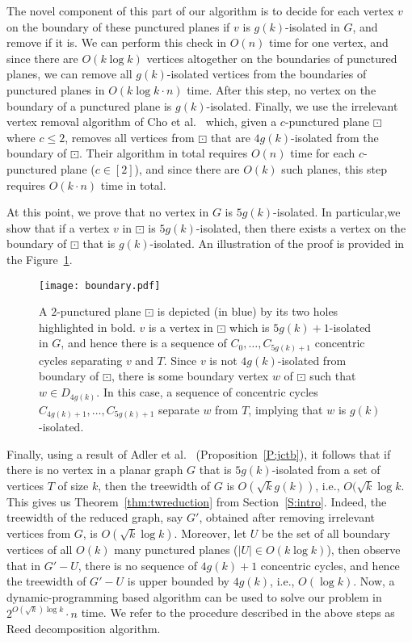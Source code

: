 \documentclass{article}
\numberwithin{claimcounter}{lemma}
\begin{document}
The novel component of this part of our algorithm is to decide for each vertex $v$ on the boundary of these punctured planes if $v$ is $g(k)$-isolated in $G$, and remove if it is. We can perform this check in $O(n)$ time for one vertex, and since there are  $O(k \log k)$ vertices altogether on the boundaries of punctured planes, we can remove all $g(k)$-isolated vertices from the boundaries of punctured planes in $O( k\log k\cdot n)$ time. After this step, no vertex on the boundary of a punctured plane is $g(k)$-isolated.  Finally, we use the irrelevant vertex removal algorithm of Cho et al.~\cite{cho2023parameterized} which, given a $c$-punctured plane $\boxdot$ where $c\leq 2$, removes all vertices from $\boxdot$ that are  $4g(k)$-isolated from the boundary of $\boxdot$. Their algorithm in total requires $O(n)$ time for each $c$-punctured plane ($c\in [2]$), and since there are $O(k)$ such planes, this step  requires $O
(k \cdot n)$ time in total.

At this point, we prove that no vertex in $G$ is $5g(k)$-isolated. In particular,we show that if a vertex $v$ in $\boxdot$  is $5g(k)$-isolated, then there exists a vertex on the boundary of $\boxdot$ that is $g(k)$-isolated. An  illustration of the proof is provided in the Figure~\ref{fig:boundaryToIn}.
\begin{figure}
    \centering
    \texttt{[image: boundary.pdf]}
    \caption{A $2$-punctured plane $\boxdot$ is depicted (in blue) by its two holes highlighted in bold.  $v$ is a vertex in $\boxdot$ which is $5g(k)+1$-isolated in $G$, and hence there is a sequence of $C_0,\ldots,C_{5g(k)+1}$ concentric cycles separating $v$ and $T$. Since $v$ is not $4g(k)$-isolated from boundary of $\boxdot$, there is some boundary vertex $w$ of $\boxdot$ such that $w\in D_{4g(k)}$. In this case, a sequence of concentric cycles $C_{4g(k)+1},\ldots,C_{5g(k)+1}$ separate $w$ from $T$, implying that $w$ is $g(k)$-isolated.}
    \label{fig:boundaryToIn}
\end{figure}

Finally, using a result of Adler et al.~\cite{adler2011tight} (Proposition~\ref{P:jctb}), it follows that if there is no vertex in a planar graph $G$ that is $5g(k)$-isolated from a set of vertices $T$ of size $k$, then the treewidth of $G$ is  $O(\sqrt{k} g(k))$, i.e.,  $O(\sqrt{k} \log k$. This gives us Theorem~\ref{thm:twreduction} from Section~\ref{S:intro}. Indeed, the treewidth of the reduced graph, say $G'$, obtained after removing irrelevant vertices from $G$, is $O(\sqrt{k}\log k)$. Moreover, let  $U$ be the set of all boundary vertices of all $O(k)$ many punctured planes ($|U| \in O(k \log k)$), then observe that in $G'-U$, there is no sequence of $4g(k)+1$ concentric cycles, and hence the treewidth of $G'-U$ is upper bounded by $4g(k)$, i.e., $O(\log k)$.  Now, a dynamic-programming based algorithm can be used to solve our problem in $2^{O(\sqrt{k})\log k}\cdot n$ time. We refer to the procedure described in the above steps as Reed decomposition algorithm. 
\end{document}

